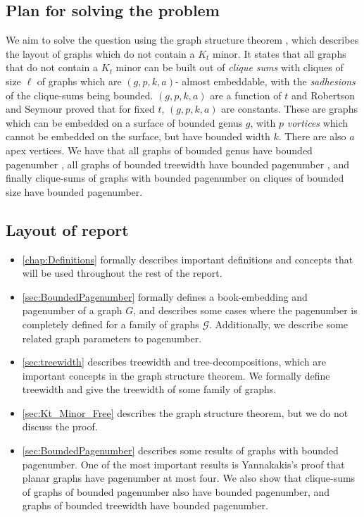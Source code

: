 \documentclass[]{report}
\theoremstyle{definition}
\numberwithin{theorem}{section}
\numberwithin{equation}{section}
\begin{document}
\subsection{Plan for solving the problem}
We aim to solve the question using the graph structure theorem \cite{robertsonGraphMinorsXVI2003}, which describes the layout of graphs which do not contain a $K_t$ minor. It states that all graphs that do not contain a $K_t$ minor can be built out of \textit{clique sums} with cliques of size $\ell$ of graphs which are $(g, p, k, a)$- almost embeddable, with the \textit{sadhesions} of the clique-sums being bounded. $(g, p, k, a)$ are a function of $t$ and Robertson and Seymour proved that for fixed $t$, $(g, p, k, a)$ are constants. These are graphs which can be embedded on a surface of bounded genus $g$, with $p$ \textit{vortices} which cannot be embedded on the surface, but have bounded width $k$. There are also $a$ apex vertices. We have that all graphs of bounded genus have bounded pagenumber \cite{heathPagenumberGenusGraphs1992}, all graphs of bounded treewidth have bounded pagenumber \cite{ganleyPagenumberTrees2001}, and finally clique-sums of graphs with bounded pagenumber on cliques of bounded size have bounded pagenumber\cite{hickingbothamStackNumberCliqueSum2023}.

\subsection{Layout of report}
\begin{itemize}
	\item \cref{chap:Definitions} formally describes important definitions and concepts that will be used throughout the rest of the report.
	\item \cref{sec:BoundedPagenumber} formally defines a book-embedding and pagenumber of a graph $G$, and describes some cases where the pagenumber is completely defined for a family of graphs $\mathcal{G}$. Additionally, we describe some related graph parameters to pagenumber.
	\item \cref{sec:treewidth} describes treewidth and tree-decompositions, which are important concepts in the graph structure theorem. We formally define treewidth and give the treewidth of some family of graphs. 
	\item \cref{sec:Kt_Minor_Free} describes the graph structure theorem, but we do not discuss the proof.
	\item \cref{sec:BoundedPagenumber} describes some results of graphs with bounded pagenumber. One of the most important results is Yannakakis's proof that planar graphs have pagenumber at most four\cite{yannakakisEmbeddingPlanarGraphs1989b}. We also show that clique-sums of graphs of bounded pagenumber also have bounded pagenumber, and graphs of bounded treewidth have bounded pagenumber.
\end{itemize}
\end{document}

